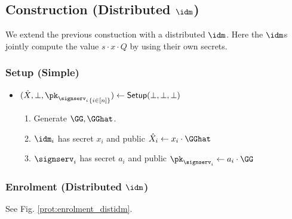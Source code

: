 \subsection{Construction (Distributed $\idm$)}
We extend the previous constuction with a distributed $\idm$. Here the $\idm$s jointly compute the value $s\cdot x\cdot Q$ by using their own secrets.

\subsubsection{Setup (Simple)}
\begin{itemize}
    \item $(\hat{X}, \bot, {\pk_{\signserv_i}}_{\{i \in [n]\}}) \gets \mathsf{Setup}(\bot, \bot, \bot)$
    \begin{enumerate}
	\item Generate $\GG, \GGhat$.
	\item $\idm_i$ has secret $x_i$ and public $\hat{X}_i \gets x_i\cdot \GGhat$
    \item $\signserv_i$ has secret $a_i$ and public $\pk_{\signserv_i} \gets a_i\cdot\GG$
\end{enumerate}
\end{itemize}

\subsubsection{Enrolment (Distributed $\idm$)}
See Fig. \ref{prot:enrolment_distidm}.
\begin{figure*}[h!]
\caption{Enrolment (Distributed \idm)}
\label{prot:enrolment_distidm}
\end{figure*}

